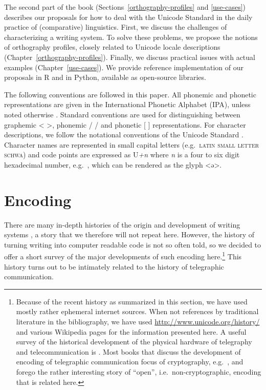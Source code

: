 The second part of the book (Sections~\ref{orthography-profiles} and
\ref{use-cases}) describes our proposals for how to deal with the Unicode
Standard in the daily practice of (comparative) linguistics. First, we discuss the
challenges of characterizing a writing system. To solve these problems, we
propose the notions of orthography profiles, closely related to Unicode locale
descriptions (Chapter~\ref{orthography-profiles}). Finally, we discuss practical
issues with actual examples (Chapter~\ref{use-cases}). We provide reference
implementation of our proposals in R and in Python, available as open-source
libraries.

The following conventions are followed in this paper. All phonemic and phonetic
representations are given in the International Phonetic Alphabet (IPA), unless
noted otherwise \citep{IPA2005}. Standard conventions are used for
distinguishing between graphemic < >, phonemic / / and phonetic [ ]
representations. For character descriptions, we follow the notational
conventions of the Unicode Standard \citep{Unicode2014}. Character names are
represented in small capital letters (e.g.~\textsc{latin small letter schwa})
and code points are expressed as U\emph{+n} where \emph{n} is a four to six
digit hexadecimal number, e.g.~, which can be rendered as the glyph <ə>.

\section{Encoding}
\label{encoding}

There are many in-depth histories of the origin and development of writing
systems \citep[e.g.~][]{Robinson1995,Powell2012}, a story that we therefore will
not repeat here. However, the history of turning writing into computer readable
code is not so often told, so we decided to offer a short survey of the major
developments of such encoding here.\footnote{Because of the recent
history as summarized in this section, we have used mostly rather ephemeral
internet sources. When not references by traditional literature in the
bibliography, we have used \url{http://www.unicode.org/history/} and various
Wikipedia pages for the information presented here. A useful survey of the
historical development of the physical hardware of telegraphy and
telecommunication is \citet{Huurdeman2003}. Most books that discuss the
development of encoding of telegraphic communication focus of cryptography,
e.g.~\citet{Singh1999}, and forego the rather interesting story of ``open'',
i.e.~non-cryptographic, encoding that is related here.} This history turns out
to be intimately related to the history of telegraphic communication.

